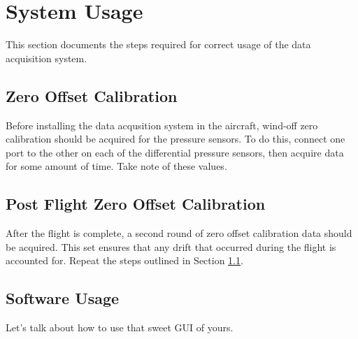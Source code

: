\chapter{System Usage}
This section documents the steps required for correct usage of the data acquisition system.

\section{Zero Offset Calibration}
\label{preflightZeroCalib}
Before installing the data acqusition system in the aircraft, wind-off zero calibration should be acquired for the pressure sensors. To do this, connect one port to the other on each of the differential pressure sensors, then acquire data for some amount of time. Take note of these values.


\section{Post Flight Zero Offset Calibration}
After the flight is complete, a second round of zero offset calibration data should be acquired. This set ensures that any drift that occurred during the flight is accounted for. Repeat the steps outlined in Section \ref{preflightZeroCalib}.


\section{Software Usage}
Let's talk about how to use that sweet GUI of yours.
